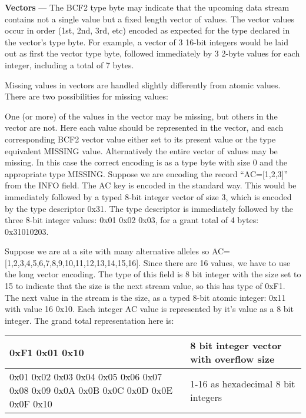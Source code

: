 \documentclass[8pt]{article}
\begin{document}
\vspace{0.3cm}

\textbf{Vectors} --- The BCF2 type byte may indicate that the upcoming data stream contains not a single value but a fixed length vector of values.  The vector values occur in order (1st, 2nd, 3rd, etc) encoded as expected for the type declared in the vector's type byte.  For example, a vector of 3 16-bit integers would be laid out as first the vector type byte, followed immediately by 3 2-byte values for each integer, including a total of 7 bytes.

Missing values in vectors are handled slightly differently from atomic values.  There are two possibilities for missing values:

One (or more) of the values in the vector may be missing, but others in the vector are not.  Here each value should be represented in the vector, and each corresponding BCF2 vector value either set to its present value or the type equivalent MISSING value.
Alternatively the entire vector of values may be missing.  In this case the correct encoding is as a type byte with size 0 and the appropriate type MISSING.
Suppose we are encoding the record ``AC=[1,2,3]'' from the INFO field.  The AC key is encoded in the standard way.  This would be immediately followed by a typed 8-bit integer vector of size 3, which is encoded by the type descriptor 0x31.  The type descriptor is immediately followed by the three 8-bit integer values: 0x01 0x02 0x03, for a grant total of 4 bytes: 0x31010203.

Suppose we are at a site with many alternative alleles so AC=[1,2,3,4,5,6,7,8,9,10,11,12,13,14,15,16].  Since there are 16 values, we have to use the long vector encoding.  The type of this field is 8 bit integer with the size set to 15 to indicate that the size is the next stream value, so this has type of 0xF1.  The next value in the stream is the size, as a typed 8-bit atomic integer: 0x11 with value 16 0x10.  Each integer AC value is represented by it's value as a 8 bit integer.  The grand total representation here is:

\vspace{0.3cm}
\begin{tabular}{|p{9cm} | p{6cm}|} \hline
0xF1 0x01 0x10 & 8 bit integer vector with overflow size \\ \hline
0x01 0x02 0x03 0x04 0x05 0x06 0x07 0x08 0x09 0x0A 0x0B 0x0C 0x0D 0x0E 0x0F 0x10 & 1-16 as hexadecimal 8 bit integers \\ \hline
\end{tabular}
\vspace{0.3cm}
\end{document}
